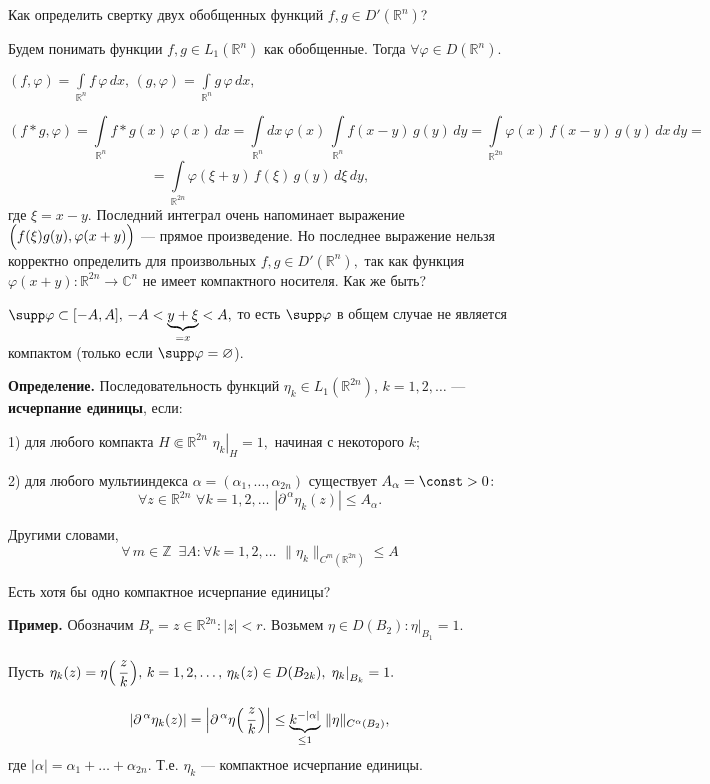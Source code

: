 \documentclass[unicode,12pt,draft]{article}
\begin{document}
Как определить свертку двух обобщенных функций $f,g\in D'(\mathbb
R^n)$?

Будем понимать функции $f,g\in L_1(\mathbb R^n)$ как обобщенные.
Тогда $\forall\varphi\in D(\mathbb R^n).$

$(f,\varphi)=\int\limits_{\mathbb R^n}f\,\varphi\,dx,\,
(g,\varphi)=\int\limits_{\mathbb R^n}g\,\varphi\,dx,$

$$(f*g,\varphi)=\int\limits_{\mathbb R^n}f*g(x)\,\varphi(x)\,dx=
\int\limits_{\mathbb R^n}dx\,\varphi(x)\, \int\limits_{\mathbb
R^n}f(x-y)\,g(y)\,dy= \int\limits_{\mathbb
R^{2n}}\varphi(x)\,f(x-y)\,g(y)\,dx\,dy=$$
 $$=\int\limits_{\mathbb
R^{2n}}\varphi(\xi+y)\,f(\xi)\,g(y)\,d\xi\,dy,$$ где $\xi=x-y.$
Последний интеграл очень напоминает выражение
$\Bigl(f(\xi)g(y),\varphi(x+y)\Bigr)$ --- прямое произведение. Но
последнее выражение нельзя корректно определить для произвольных
$f,g\in D'(\mathbb R^n),$ так как функция $\varphi(x+y)\colon
\mathbb R^{2n}\to\mathbb C^n$ не имеет компактного носителя. Как
же быть?

$\supp \varphi\subset[-A,A], \,-A<\underbrace{y+\xi}_{=x}<A,$ то
есть $\supp \varphi$ в общем случае не является компактом (только
если $\supp \varphi=\varnothing$).

\textbf{Определение.} Последовательность функций $\eta_k\in
L_1(\mathbb R^{2n}),\,k=1,2,\ldots$ --- \textbf{исчерпание
единицы}, если:

1) для любого компакта $H\Subset\mathbb R^{2n}\,\,
\left.\eta_k\right|_H=1,$ начиная с некоторого $k$;

2) для любого мультииндекса $\alpha=(\alpha_1,\ldots,\alpha_{2n})$
существует $A_{\alpha}=\const  >0\colon$
$$\forall z\in\mathbb
R^{2n}\,\, \forall k=1,2,\ldots\,\,
|\partial^{\,\alpha}\eta_k(z)|\le A_{\alpha}.$$

Другими словами, $$\forall\, m\in \mathbb Z \,\,\,\exists A\colon
\forall k=1,2,\ldots\,\,\|\eta_k\|_{C^m(\mathbb R^{2n})}\le A$$

Есть хотя бы одно компактное исчерпание единицы?

\textbf{Пример.} Обозначим $B_r={z\in\mathbb R^{2n}\colon |z|<r}.$
Возьмем $\eta\in D(B_2)\colon \left.\eta\right|_{B_1}=1.$

Пусть $\eta_k(z)=\eta\Bigl(\,\cfrac zk\,\Bigr),\,k=1,2,\ldots,\,
\eta_k(z)\in D(B_{2k}),\, \left.\eta_k\right|_{B_k}=1.$

$$|\partial^{\,\alpha}\eta_k(z)|=\Bigl|\partial^{\,\alpha}\eta\Bigl(\,\cfrac
zk\,\Bigr)\Bigr|\le
\underbrace{k^{-|\alpha|}}_{\le1}\,\|\eta\|_{C^{\alpha}(B_2)},$$
где $|\alpha|=\alpha_1+\ldots+\alpha_{2n}$. Т.е. $\eta_k$ ---
компактное исчерпание единицы.
\end{document}

